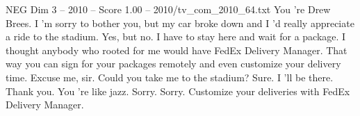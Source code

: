 \begin{textsample}{NEG Dim 3 – 2010 – Score 1.00 – 2010/tv\_com\_2010\_64.txt}  \label{ex:f3_neg_054}
You 're Drew Brees.
I 'm sorry to bother you, but my car broke down and I 'd really appreciate a ride to the stadium.
Yes, but no.
I have to stay here and wait for a package.
I thought anybody who rooted for me would have FedEx Delivery Manager.
That way you can sign for your packages remotely and even customize your delivery time.
Excuse me, sir.
Could you take me to the stadium?
Sure.
I 'll be there.
Thank you.
You 're like jazz.
Sorry.
Sorry.
Customize your deliveries with FedEx Delivery Manager.

\end{textsample}
